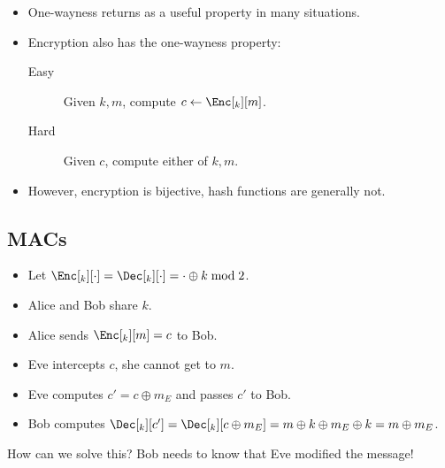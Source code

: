 \begin{frame}
  \begin{remark}
    \begin{itemize}
      \item One-wayness returns as a useful property in many situations.
      \item Encryption also has the one-wayness property:
        \begin{description}
          \item[Easy] Given \(k, m\), compute \(c\gets \Enc[_k][m]\).
          \item[Hard] Given \(c\), compute either of \(k, m\).
        \end{description}
      \item However, encryption is bijective, hash functions are generally not.
    \end{itemize}
  \end{remark}
\end{frame}

\subsection{\Aclp{MAC}}

\begin{frame}
  \begin{example}
    \begin{itemize}
      \item Let \(\Enc[_k][\cdot] = \Dec[_k][\cdot] = \cdot\oplus k\bmod 2\).
        
        \pause{}

      \item Alice and Bob share \(k\).
      \item Alice sends \(\Enc[_k][m] = c\) to Bob.

        \pause{}

      \item Eve intercepts \(c\), she cannot get to \(m\).

        \pause{}

      \item Eve computes \(c' = c\oplus m_E\) and passes \(c'\) to Bob.

        \pause{}

      \item Bob computes \(\Dec[_k][c'] = \Dec[_k][c\oplus m_E] = m\oplus 
        k\oplus m_E\oplus k = m\oplus m_E\).
    \end{itemize}
  \end{example}

  \pause{}
  
  \begin{exercise}
    How can we solve this?
    Bob needs to know that Eve modified the message!
  \end{exercise}
\end{frame}


